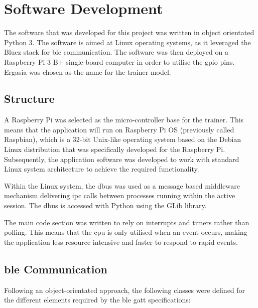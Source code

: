 
\chapter{Software Development}
\label{ch:software}

\vspace*{-0.5cm}

The software that was developed for this project was written in object orientated Python 3. The software is aimed at Linux operating systems, as it leveraged the Bluez stack for \ac{ble} communication. The software was then deployed on a Raspberry Pi 3 B+ single-board computer in order to utilise the \ac{gpio} pins. Ergasia was chosen as the name for the trainer model.

\vspace*{-0.5cm}

\section{Structure}

A Raspberry Pi was selected as the micro-controller base for the trainer. This means that the application will run on Raspberry Pi OS (previously called Raspbian), which is a 32-bit Unix-like operating system based on the Debian Linux distribution that was specifically developed for the Raspberry Pi. Subsequently, the application software was developed to work with standard Linux system architecture to achieve the required functionality.

Within the Linux system, the \ac{dbus} was used as a message based middleware mechanism delivering \ac{ipc} calls between processes running within the active session. The \ac{dbus} is accessed with Python using the GLib library.

The main code section was written to rely on interrupts and timers rather than polling. This means that the \ac{cpu} is only utilised when an event occurs, making the application less resource intensive and faster to respond to rapid events.

\section{\acl{ble} Communication}

Following an object-orientated approach, the following classes were defined for the different elements required by the \ac{ble} \ac{gatt} specifications:

